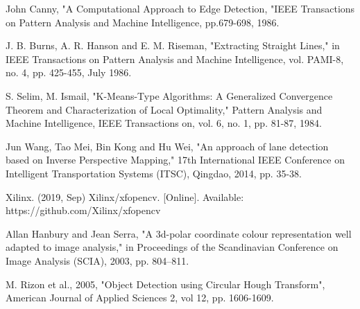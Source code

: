 \documentclass[conference]{IEEEtran}
\begin{document}
\begin{thebibliography}{00}
 John Canny, "A Computational Approach to Edge Detection, "IEEE Transactions on Pattern Analysis and Machine Intelligence, pp.679-698, 1986.

 J. B. Burns, A. R. Hanson and E. M. Riseman, "Extracting Straight Lines," in IEEE Transactions on Pattern Analysis and Machine Intelligence, vol. PAMI-8, no. 4, pp. 425-455, July 1986.

 S. Selim, M. Ismail, "K-Means-Type Algorithms: A Generalized Convergence Theorem and Characterization of Local Optimality," Pattern Analysis and Machine Intelligence, IEEE Transactions on, vol. 6, no. 1, pp. 81-87, 1984. 

 Jun Wang, Tao Mei, Bin Kong and Hu Wei, "An approach of lane detection based on Inverse Perspective Mapping," 17th International IEEE Conference on Intelligent Transportation Systems (ITSC), Qingdao, 2014, pp. 35-38.

 Xilinx. (2019, Sep) Xilinx/xfopencv. [Online]. Available:  https://github.com/Xilinx/xfopencv

 Allan Hanbury and Jean Serra, "A 3d-polar coordinate colour representation well adapted to image analysis," in Proceedings of the Scandinavian Conference on Image Analysis (SCIA), 2003, pp. 804–811.

 M. Rizon et al., 2005, "Object Detection using Circular Hough Transform", American Journal of Applied Sciences 2, vol 12, pp. 1606-1609.
\end{thebibliography}
\vspace{12pt}
\end{document}
